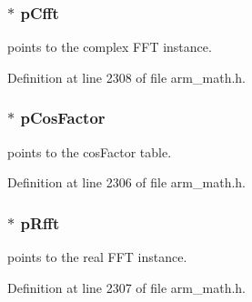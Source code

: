 \subsubsection[{\texorpdfstring{p\+Cfft}{pCfft}}]{$\ast$ p\+Cfft}\hypertarget{structarm__dct4__instance__q31_a0b1f4a05c1824bab3b9bd837a260232a}{}\label{structarm__dct4__instance__q31_a0b1f4a05c1824bab3b9bd837a260232a}
points to the complex F\+FT instance. 

Definition at line 2308 of file arm\+\_\+math.\+h.

\subsubsection[{\texorpdfstring{p\+Cos\+Factor}{pCosFactor}}]{$\ast$ p\+Cos\+Factor}\hypertarget{structarm__dct4__instance__q31_af06acf18dc6547fc29aba2eb68cc63f0}{}\label{structarm__dct4__instance__q31_af06acf18dc6547fc29aba2eb68cc63f0}
points to the cos\+Factor table. 

Definition at line 2306 of file arm\+\_\+math.\+h.

\subsubsection[{\texorpdfstring{p\+Rfft}{pRfft}}]{$\ast$ p\+Rfft}\hypertarget{structarm__dct4__instance__q31_a16c74f8496e1691e62da3c57e0c676eb}{}\label{structarm__dct4__instance__q31_a16c74f8496e1691e62da3c57e0c676eb}
points to the real F\+FT instance. 

Definition at line 2307 of file arm\+\_\+math.\+h.

